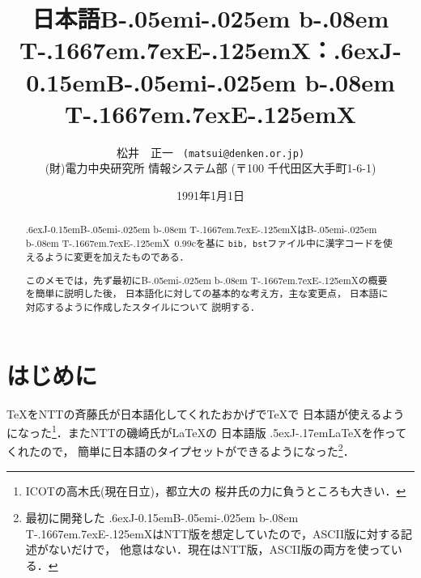 ﻿
\def\dg{\gt}
\def\dm{\mc}
\voffset=-2.3cm
\hoffset=-2.3cm
\textheight=25.5cm
\textwidth=16.6cm

\def\JTeX{\leavevmode\lower .5ex\hbox{J}\kern-.17em\TeX}
\def\JLaTeX{\leavevmode\lower.5ex\hbox{J}\kern-.17em\LaTeX}

\def\BibTeX{{\rm B\kern-.05em{\sc i\kern-.025em b}\kern-.08em
    T\kern-.1667em\lower.7ex\hbox{E}\kern-.125emX}}

\def\JBibTeX{\leavevmode\lower .6ex\hbox{J}\kern-0.15em\BibTeX}

\def\myftnote#1{\footnote{\parindent=16pt\hskip-15pt\hang\indent#1\parindent=10pt}}


\def\tstrut{\vrule height 2.346ex depth 0.908ex width 0pt}
\thicksize=0.7pt
\thinsize=0.3pt

\setcounter{topnumber}{3}
\setcounter{bottomnumber}{3}
\setcounter{totalnumber}{6}
\renewcommand{\topfraction}{0.99}
\renewcommand{\bottomfraction}{0.99}
\renewcommand{\textfraction}{0.01}

\title{日本語\BibTeX：\JBibTeX}
\author{松井　正一 {\tt\ (matsui@denken.or.jp)}\\
\normalsize (財)電力中央研究所 情報システム部 (〒100 千代田区大手町1-6-1) }
\date{1991年1月1日}

\baselineskip=16pt

\maketitle

\begin{abstract}

\JBibTeX は\BibTeX\ 0.99cを基に
{\tt bib, bst}ファイル中に漢字コードを使えるように変更を加えたものである．

このメモでは，先ず最初に\BibTeX の概要を簡単に説明した後，
日本語化に対しての基本的な考え方，主な変更点，
日本語に対応するように作成したスタイルについて
説明する．
\end{abstract}

\section{はじめに}

\TeX をNTTの斉藤氏が日本語化してくれたおかげで\TeX で
日本語が使えるようになった\myftnote{ICOTの高木氏(現在日立)，都立大の
桜井氏の力に負うところも大きい．}．またNTTの磯崎氏が\LaTeX の
日本語版 \JLaTeX を作ってくれたので，
簡単に日本語のタイプセットができるようになった\myftnote{最初に開発した
\JBibTeX はNTT版を想定していたので，ASCII版に対する記述がないだけで，
他意はない．現在はNTT版，ASCII版の両方を使っている．}．

